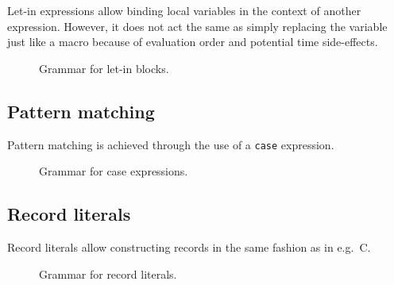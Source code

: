 Let-in expressions allow binding local variables in the context of another expression.
However, it does not act the same as simply replacing the variable just like a macro because of evaluation order and potential time side-effects.

\begin{figure}[H]
  \centering


  \caption{Grammar for let-in blocks.}
  \label{fig:zilch-grammar-expressions-letin-grammar}
\end{figure}

\subsection{Pattern matching}\label{subsec:zilch-grammar-expressions-case}

Pattern matching is achieved through the use of a \texttt{case} expression.

\begin{figure}[H]
  \centering


  \caption{Grammar for case expressions.}
  \label{fig:zilch-gramma-expressions-case-grammar}
\end{figure}

\subsection{Record literals}\label{subsec:zilch-grammar-expressions-record}

Record literals allow constructing records in the same fashion as in e.g.\ C.

\begin{figure}[H]
  \centering


  \caption{Grammar for record literals.}
  \label{fig:zilch-gramma-expressions-record-grammar}
\end{figure}

